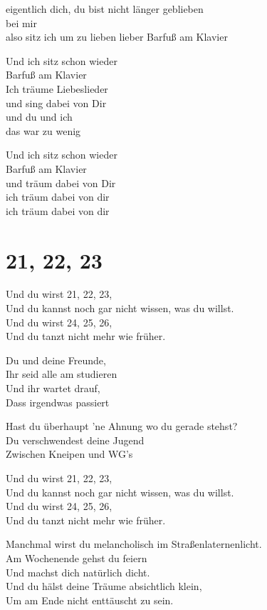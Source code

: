\documentclass[]{book}
\begin{document}
eigentlich dich, du bist nicht länger geblieben\\
bei mir\\
also sitz ich um zu lieben lieber Barfuß am Klavier

Und ich sitz schon wieder\\
Barfuß am Klavier\\
Ich träume Liebeslieder\\
und sing dabei von Dir\\
und du und ich\\
das war zu wenig

Und ich sitz schon wieder\\
Barfuß am Klavier\\
und träum dabei von Dir\\
ich träum dabei von dir\\
ich träum dabei von dir

\hypertarget{section}{%
\section{21, 22, 23}\label{section}}

Und du wirst 21, 22, 23,\\
Und du kannst noch gar nicht wissen, was du willst.\\
Und du wirst 24, 25, 26,\\
Und du tanzt nicht mehr wie früher.

Du und deine Freunde,\\
Ihr seid alle am studieren\\
Und ihr wartet drauf,\\
Dass irgendwas passiert

Hast du überhaupt 'ne Ahnung wo du gerade stehst?\\
Du verschwendest deine Jugend\\
Zwischen Kneipen und WG's

Und du wirst 21, 22, 23,\\
Und du kannst noch gar nicht wissen, was du willst.\\
Und du wirst 24, 25, 26,\\
Und du tanzt nicht mehr wie früher.

Manchmal wirst du melancholisch im Straßenlaternenlicht.\\
Am Wochenende gehst du feiern\\
Und machst dich natürlich dicht.\\
Und du hälst deine Träume absichtlich klein,\\
Um am Ende nicht enttäuscht zu sein.
\end{document}
